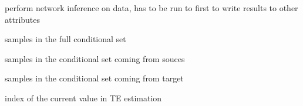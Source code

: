 \documentclass[letterpaper,10pt,english]{sphinxmanual}
\begin{document}
\begin{fulllineitems}
\begin{quote}
\begin{description}
\begin{itemize}
\end{itemize}

\end{description}\end{quote}

\begin{fulllineitems}
\label{index:multivariate_te.Multivariate_te.analyse_network}
perform network inference on data, has to be run to
first to write results to other attributes

\end{fulllineitems}


\begin{fulllineitems}
\label{index:multivariate_te.Multivariate_te.conditional_full}
samples in the full conditional set

\end{fulllineitems}


\begin{fulllineitems}
\label{index:multivariate_te.Multivariate_te.conditional_sources}
samples in the conditional set coming from souces

\end{fulllineitems}


\begin{fulllineitems}
\label{index:multivariate_te.Multivariate_te.conditional_target}
samples in the conditional set coming from target

\end{fulllineitems}


\begin{fulllineitems}
\label{index:multivariate_te.Multivariate_te.current_value}
index of the current value in TE estimation

\end{fulllineitems}


\end{fulllineitems}
\end{document}
